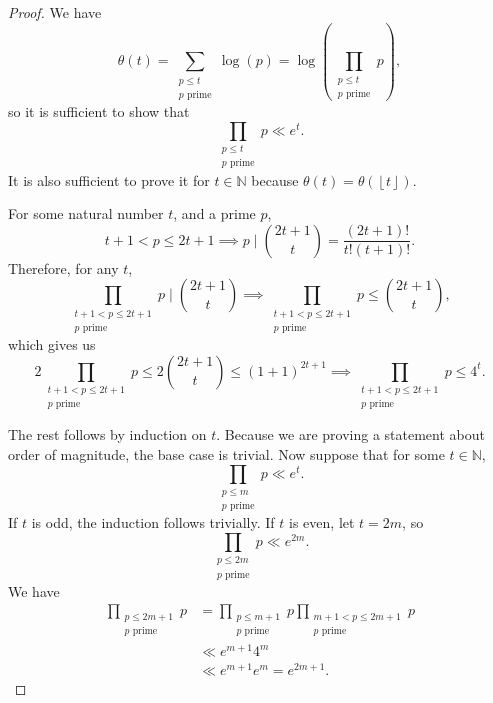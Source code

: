 \documentclass[12pt]{amsart}
\begin{document}
\begin{proof}
We have
\[
    \theta(t) = \sum _{\substack{ p \leq t \\ p \text{ prime}  }} \log \left( p \right) = \log \left( \prod _{\substack{ p \leq t \\  p \text{ prime}  }} p \right) 
,\]
so it is sufficient to show that
\[
    \prod _{\substack{ p \leq t \\ p \text{ prime}  }} p \ll e^{t}
.\]
It is also sufficient to prove it for \(t \in \mathbb{N} \) because \(\theta(t) = \theta\left( \left\lfloor t \right\rfloor  \right) \).

For some natural number \(t\), and a prime \(p\),
\[
    t + 1 < p \leq 2t + 1 \implies p \mid \binom{2t + 1}{t} = \frac{\left( 2t + 1 \right) !}{t! (t+1)!} 
.\]
Therefore, for any \(t\),
\[
    \prod _{\substack{ t + 1 < p \leq 2t + 1\\ p \text{ prime}   }} p   \mid \binom{2t+1}{t} \implies \prod _{\substack{ t + 1 < p \leq 2t + 1\\ p \text{ prime}   }} p   \leq  \binom{2t+1}{t}
,\]
which gives us
\[
    2 \prod _{\substack{ t + 1 < p \leq 2t + 1\\ p \text{ prime}   }} p   \leq  2 \binom{2t+1}{t} \leq (1+1)^{2t + 1} \implies \prod _{\substack{ t + 1 < p \leq 2t + 1\\ p \text{ prime}   }} p  \leq 4^{t}
.\]

The rest follows by induction on \(t\). Because we are proving
a statement about order of magnitude, the base case is trivial. Now suppose that
for some \(t \in \mathbb{N} \),
\[
    \prod _{\substack{ p \leq m \\p \text{ prime}  }} p \ll e^{t}
.\]
If \(t\) is odd, the induction follows trivially. If \(t\) is even, let \(t = 2m\),
so
\[
    \prod  _{\substack{ p \leq 2m \\ p \text{ prime}  }} p\ll e^{2m}
.\]
We have
\begin{align*}
\prod _{\substack{ p \leq 2m + 1 \\ p \text{ prime}  }} p & = \prod _{\substack{ p \leq m + 1 \\ p \text{ prime}  }} p \prod _{\substack{ m + 1 < p \leq 2m + 1 \\ p \text{ prime}  }} p \\
& \ll e^{m + 1} 4^{m} \\
& \ll e^{m+1} e^{m} = e^{2m+1}. 
\end{align*}
\end{proof}
\end{document}
